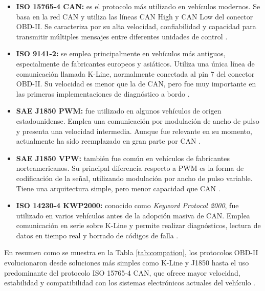 \begin{itemize}
    \item \textbf{ISO 15765-4 CAN:} es el protocolo más utilizado en vehículos modernos. Se basa en la red CAN y utiliza las líneas CAN High y CAN Low del conector OBD-II. Se caracteriza por su alta velocidad, confiabilidad y capacidad para transmitir múltiples mensajes entre diferentes unidades de control \citep{Flexihub_OBD2, CISE_CAN}.

    \item \textbf{ISO 9141-2:} se emplea principalmente en vehículos más antiguos, especialmente de fabricantes europeos y asiáticos. Utiliza una única línea de comunicación llamada K-Line, normalmente conectada al pin 7 del conector OBD-II. Su velocidad es menor que la de CAN, pero fue muy importante en las primeras implementaciones de diagnóstico a bordo \citep{Flexihub_OBD2}.

    \item \textbf{SAE J1850 PWM:} fue utilizado en algunos vehículos de origen estadounidense. Emplea una comunicación por modulación de ancho de pulso y presenta una velocidad intermedia. Aunque fue relevante en su momento, actualmente ha sido reemplazado en gran parte por CAN \citep{Autosoporte_OBDII, EquipoAutomotrizJAVAZ_OBD2}.

    \item \textbf{SAE J1850 VPW:} también fue común en vehículos de fabricantes norteamericanos. Su principal diferencia respecto a PWM es la forma de codificación de la señal, utilizando modulación por ancho de pulso variable. Tiene una arquitectura simple, pero menor capacidad que CAN \citep{Autosoporte_OBDII, EquipoAutomotrizJAVAZ_OBD2}.

    \item \textbf{ISO 14230-4 KWP2000:} conocido como \textit{Keyword Protocol 2000}, fue utilizado en varios vehículos antes de la adopción masiva de CAN. Emplea comunicación en serie sobre K-Line y permite realizar diagnósticos, lectura de datos en tiempo real y borrado de códigos de falla \citep{Autoavance_OBD2, Autosoporte_OBDII}.
\end{itemize}

En resumen como se muestra en la Tabla \ref{tab:compation}, los protocolos OBD-II evolucionaron desde soluciones más simples como K-Line y J1850 hasta el uso predominante del protocolo ISO 15765-4 CAN, que ofrece mayor velocidad, estabilidad y compatibilidad con los sistemas electrónicos actuales del vehículo \citep{Autoavance_OBD2, Flexihub_OBD2}.

